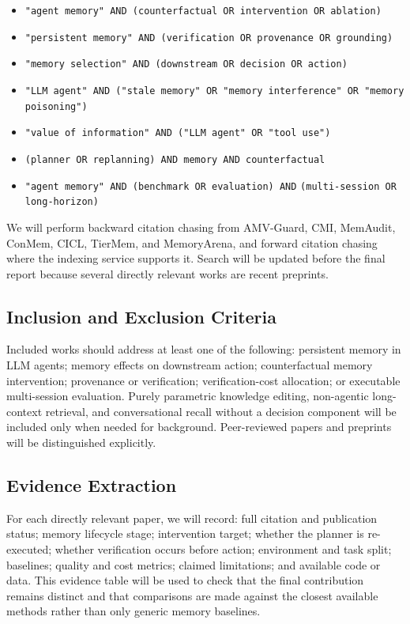 \documentclass[11pt]{article}
\begin{document}
\begin{itemize}
  \item \texttt{"agent memory" AND (counterfactual OR intervention OR ablation)}
  \item \texttt{"persistent memory" AND (verification OR provenance OR grounding)}
  \item \texttt{"memory selection" AND (downstream OR decision OR action)}
  \item \texttt{"LLM agent" AND ("stale memory" OR "memory interference"}\allowbreak\ \texttt{OR "memory poisoning")}
  \item \texttt{"value of information" AND ("LLM agent" OR "tool use")}
  \item \texttt{(planner OR replanning) AND memory AND counterfactual}
  \item \texttt{"agent memory" AND (benchmark OR evaluation) AND}\newline
  \hspace*{1em}\texttt{(multi-session OR long-horizon)}
\end{itemize}

We will perform backward citation chasing from AMV-Guard, CMI, MemAudit, ConMem, CICL, TierMem, and MemoryArena, and forward citation chasing where the indexing service supports it. Search will be updated before the final report because several directly relevant works are recent preprints.

\subsection{Inclusion and Exclusion Criteria}

Included works should address at least one of the following: persistent memory in LLM agents; memory effects on downstream action; counterfactual memory intervention; provenance or verification; verification-cost allocation; or executable multi-session evaluation. Purely parametric knowledge editing, non-agentic long-context retrieval, and conversational recall without a decision component will be included only when needed for background. Peer-reviewed papers and preprints will be distinguished explicitly.

\subsection{Evidence Extraction}

For each directly relevant paper, we will record: full citation and publication status; memory lifecycle stage; intervention target; whether the planner is re-executed; whether verification occurs before action; environment and task split; baselines; quality and cost metrics; claimed limitations; and available code or data. This evidence table will be used to check that the final contribution remains distinct and that comparisons are made against the closest available methods rather than only generic memory baselines.



\end{document}
